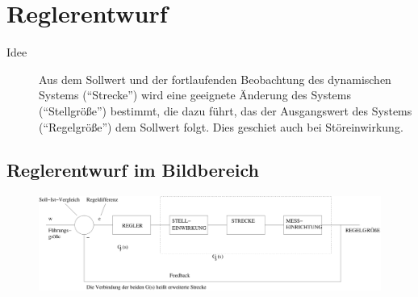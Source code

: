 \message{ !name(Mitschrieb_SysRegel.tex)}\documentclass[12pt,a4paper,ngerman]{scrartcl}
\begin{document}
\section{Reglerentwurf}

\begin{description}
\item[Idee] Aus dem Sollwert und der fortlaufenden Beobachtung des dynamischen Systems (``Strecke'') wird eine geeignete Änderung des Systems (``Stellgröße'') bestimmt, die dazu führt, das der Ausgangswert des Systems (``Regelgröße'') dem Sollwert folgt. Dies geschiet auch bei Störeinwirkung.
\end{description}

\subsection{Reglerentwurf im Bildbereich}
\begin{figure}[H]
  \centering
\includegraphics[width=\linewidth]{sysregel_regler}  

\end{figure}
\end{document}

